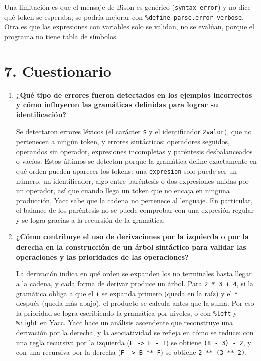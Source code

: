 \documentclass{article}
\begin{document}
    Una limitación es que el mensaje de Bison es genérico (\texttt{syntax error}) y no dice qué token se esperaba; se podría mejorar con \texttt{\%define parse.error verbose}. Otra es que las expresiones con variables solo se validan, no se evalúan, porque el programa no tiene tabla de símbolos.
    \newpage

\section{7. Cuestionario}
    \begin{enumerate}
        \item \textbf{¿Qué tipo de errores fueron detectados en los ejemplos incorrectos y cómo influyeron las gramáticas definidas para lograr su identificación?}

        Se detectaron errores léxicos (el carácter \texttt{\$} y el identificador \texttt{2valor}), que no pertenecen a ningún token, y errores sintácticos: operadores seguidos, operandos sin operador, expresiones incompletas y paréntesis desbalanceados o vacíos. Estos últimos se detectan porque la gramática define exactamente en qué orden pueden aparecer los tokens: una \texttt{expresion} solo puede ser un número, un identificador, algo entre paréntesis o dos expresiones unidas por un operador, así que cuando llega un token que no encaja en ninguna producción, Yacc sabe que la cadena no pertenece al lenguaje. En particular, el balance de los paréntesis no se puede comprobar con una expresión regular y se logra gracias a la recursión de la gramática.

        \item \textbf{¿Cómo contribuye el uso de derivaciones por la izquierda o por la derecha en la construcción de un árbol sintáctico para validar las operaciones y las prioridades de las operaciones?}

        La derivación indica en qué orden se expanden los no terminales hasta llegar a la cadena, y cada forma de derivar produce un árbol. Para \texttt{2 * 3 + 4}, si la gramática obliga a que el \texttt{+} se expanda primero (queda en la raíz) y el \texttt{*} después (queda más abajo), el producto se calcula antes que la suma. Por eso la prioridad se logra escribiendo la gramática por niveles, o con \texttt{\%left} y \texttt{\%right} en Yacc. Yacc hace un análisis ascendente que reconstruye una derivación por la derecha, y la asociatividad se refleja en cómo se reduce: con una regla recursiva por la izquierda (\texttt{E -> E - T}) se obtiene \texttt{(8 - 3) - 2}, y con una recursiva por la derecha (\texttt{F -> B ** F}) se obtiene \texttt{2 ** (3 ** 2)}.


\end{enumerate}
\end{document}
